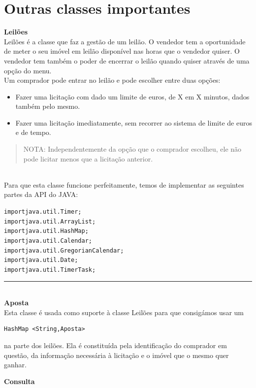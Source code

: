 \documentclass[12pt]{article}
\newenvironment{code}                    
{\textbf{
} \hspace{1cm} \hrulefill \\ 
\smallskip 
\begin{center}
\begin{minipage}{0.9\textwidth} 
\begin{alltt}\small}
{\end{alltt}
\end{minipage}
\end{center}
\hrule\smallskip
}
\begin{document}
\pagebreak
\section{Outras classes importantes}

\textbf{Leilões}
\newline
~\\

Leilões é a classe que faz a gestão de um leilão. O vendedor tem a oportunidade de meter o seu imóvel em leilão disponível nas horas que o vendedor quiser. O vendedor tem também o poder de encerrar o leilão quando quiser através de uma opção do menu.
~\\

Um comprador pode entrar no leilão e pode escolher entre duas opções:
\begin{itemize}
\item Fazer uma licitação com dado um limite de euros, de X em X minutos, dados também pelo mesmo. 
\item Fazer uma licitação imediatamente, sem recorrer ao sistema de limite de euros e de tempo.
\end{itemize}
\begin{quote}
NOTA: Independentemente da opção que o comprador escolheu, ele não pode licitar menos que a licitação anterior.
\end{quote}
~\\

Para que esta classe funcione perfeitamente, temos de implementar as seguintes partes da API do JAVA:
\newline
\begin{code}
import java.util.Timer;
import java.util.ArrayList;
import java.util.HashMap;
import java.util.Calendar;
import java.util.GregorianCalendar;
import java.util.Date;
import java.util.TimerTask;
\end{code}
~\\

\textbf{Aposta}
\newline
~\\

Esta classe é usada como suporte à classe Leilões para que consigámos usar um 
\begin{verbatim}
HashMap <String,Aposta>
\end{verbatim}
na parte dos leilões.
Ela é constituída pela identificação do comprador em questão, da informação necessária à licitação e o imóvel que o mesmo quer ganhar.

\textbf{Consulta}
\newline
~\\
\end{document}
